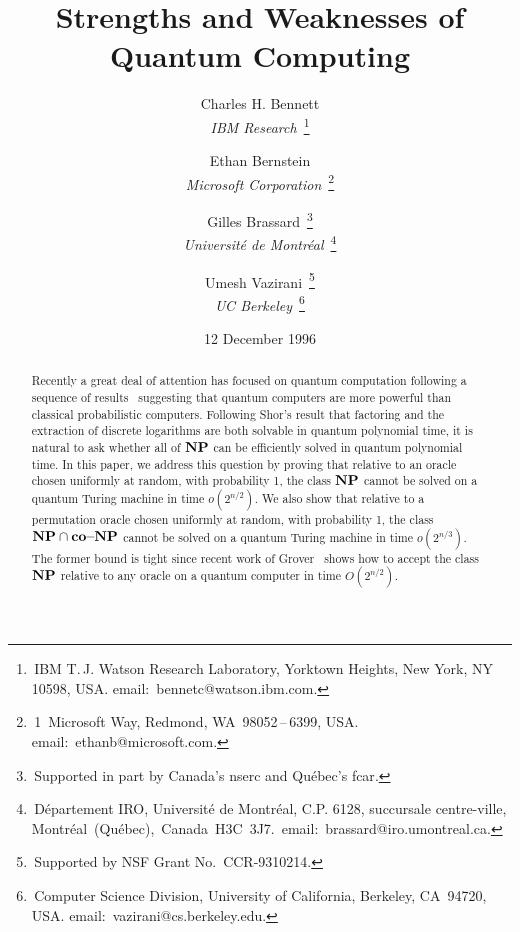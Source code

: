 \title{Strengths and Weaknesses of Quantum Computing}

\author{
Charles H. Bennett \\ {\protect\small\sl IBM Research\/}\,%
\thanks{\,IBM T.\,J. Watson Research Laboratory, Yorktown Heights,
New York, NY 10598, USA.\hfill\mbox{} \mbox{email: bennetc@watson.ibm.com}.}
\\[-1ex] \hspace{5cm}
\and
Ethan Bernstein \\ {\protect\small\sl Microsoft Corporation\/}\,%
\thanks{\,1~Microsoft Way, Redmond, \mbox{WA 98052\,--\,6399}, USA.
\mbox{email: ethanb@microsoft.com}.}
\\[-1ex] \hspace{5cm}
\and
Gilles Brassard\,%
\thanks{\,Supported in part by Canada's {\sc nserc} and Qu\'ebec's
{\sc fcar}.}\\
{\protect\small\sl Universit\'e de Montr\'eal\/}\,%
\thanks{\,D\'epartement IRO, Universit\'e de Montr\'eal,
C.P. 6128, succursale centre-ville,\hfill\mbox{}
\mbox{Montr\'eal (Qu\'ebec), Canada H3C 3J7.
email: brassard@iro.umontreal.ca}.}
\\[-1ex] \hspace{5cm}
\and
Umesh Vazirani\,%
\thanks{\,Supported by NSF Grant No.~CCR-9310214.}
\\ {\protect \small \sl UC Berkeley\/}\,%
\thanks{\,Computer Science Division, University of California, Berkeley,
\mbox{CA 94720}, USA.\hfill\mbox{}
\mbox{email: vazirani@cs.berkeley.edu}.}
\\[-1ex] \hspace{5cm}
}


\date{12 December 1996}

\maketitle

\begin{abstract}

Recently a great deal of attention has focused on quantum computation
following a sequence of results~\cite{BV,Si,Sh} suggesting that
quantum computers are more powerful than classical probabilistic
computers. Following Shor's result that factoring and
the extraction of discrete logarithms
are both solvable in quantum polynomial time, it is natural to
ask whether all of $\mbox{\bf NP}$ can be efficiently solved in quantum polynomial time.
In this paper, we address this question by proving that
relative to an oracle chosen uniformly at random, with probability 1,
the class $\mbox{\bf NP}$ cannot be solved on a quantum Turing machine in time
$o(2^{n/2})$. We also show that relative to a permutation oracle chosen
uniformly at random, with probability 1, the class $\mbox{\bf NP} \cap \mbox{\bf co--NP}$ cannot be
solved on a quantum Turing machine in time $o(2^{n/3})$.  The former bound is
tight since recent work of Grover~\cite{Gr} shows how to accept the class $\mbox{\bf NP}$
relative to any oracle on a quantum computer in time $O(2^{n/2})$.

\end{abstract}
\thispagestyle{empty}


